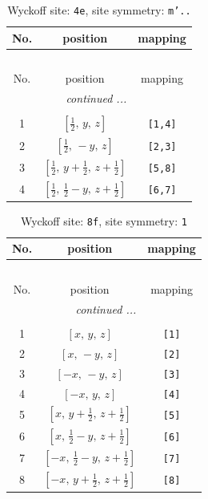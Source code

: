 \documentclass[fleqn,8pt]{jsarticle}
\begin{document}
\renewcommand{\arraystretch}{1.2}
\begin{longtable}{ccc}
\caption{Wyckoff site: {\tt 4e}, site symmetry: {\tt m'..}}
 \\
 \hline \hline
No. & position & mapping \\ \hline \endfirsthead

\multicolumn{2}{l}{\tablename\ \thetable{}} \\
 \hline \hline
No. & position & mapping \\ \hline \endhead

 \hline \hline
\multicolumn{2}{r}{\footnotesize\it continued ...} \\ \endfoot

 \hline \hline
\multicolumn{2}{r}{} \\ \endlastfoot

1 & $\left[ \frac{1}{2},\, y,\, z \right]$ & {\tt [1,4]} \\ \hline
2 & $\left[ \frac{1}{2},\, - y,\, z \right]$ & {\tt [2,3]} \\ \hline
3 & $\left[ \frac{1}{2},\, y + \frac{1}{2},\, z + \frac{1}{2} \right]$ & {\tt [5,8]} \\ \hline
4 & $\left[ \frac{1}{2},\, \frac{1}{2} - y,\, z + \frac{1}{2} \right]$ & {\tt [6,7]} \\
\end{longtable}
\renewcommand{\arraystretch}{1.2}
\begin{longtable}{ccc}
\caption{Wyckoff site: {\tt 8f}, site symmetry: {\tt 1}}
 \\
 \hline \hline
No. & position & mapping \\ \hline \endfirsthead

\multicolumn{2}{l}{\tablename\ \thetable{}} \\
 \hline \hline
No. & position & mapping \\ \hline \endhead

 \hline \hline
\multicolumn{2}{r}{\footnotesize\it continued ...} \\ \endfoot

 \hline \hline
\multicolumn{2}{r}{} \\ \endlastfoot

1 & $\left[ x,\, y,\, z \right]$ & {\tt [1]} \\ \hline
2 & $\left[ x,\, - y,\, z \right]$ & {\tt [2]} \\ \hline
3 & $\left[ - x,\, - y,\, z \right]$ & {\tt [3]} \\ \hline
4 & $\left[ - x,\, y,\, z \right]$ & {\tt [4]} \\ \hline
5 & $\left[ x,\, y + \frac{1}{2},\, z + \frac{1}{2} \right]$ & {\tt [5]} \\ \hline
6 & $\left[ x,\, \frac{1}{2} - y,\, z + \frac{1}{2} \right]$ & {\tt [6]} \\ \hline
7 & $\left[ - x,\, \frac{1}{2} - y,\, z + \frac{1}{2} \right]$ & {\tt [7]} \\ \hline
8 & $\left[ - x,\, y + \frac{1}{2},\, z + \frac{1}{2} \right]$ & {\tt [8]} \\
\end{longtable}
\end{document}
